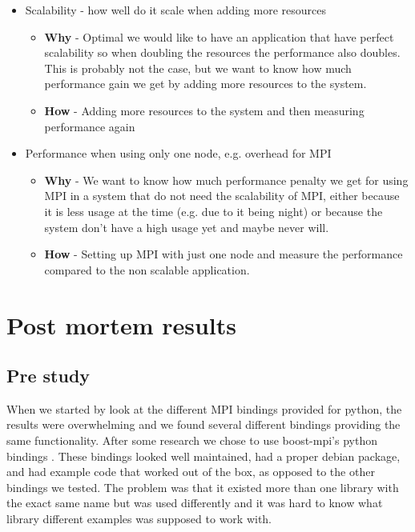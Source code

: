 \documentclass{article}
\begin{document}
\begin{itemize}
\begin{itemize}
{ performance we want to know how much we are able to increase it by using MPI. }
\item{ \textbf{How} - Measure the time to run the program with \emph{time}} (a UNIX command)
\end{itemize}
\item Scalability - how well do it scale when adding more resources
\begin{itemize}
\item{ \textbf{Why} - Optimal we would like to have an application that have
perfect scalability \cite{jogalekar2000evaluating} so when doubling the
resources the performance also doubles. This is probably not the case, but we
want to know how much performance gain we get by adding more resources to the
system. }


\item{ \textbf{How} - Adding more resources to the system and then measuring performance
 again}
\end{itemize}
\item Performance when using only one node, e.g. overhead for MPI
\begin{itemize}
\item{ \textbf{Why} - We want to know how much performance penalty we get for using
MPI in a system that do not need the scalability of MPI, either because it is 
less usage at the time (e.g. due to it being night) or because the system
don't have a high usage yet and maybe never will.}
\item{ \textbf{How} - Setting up MPI with just one node and measure the performance
 compared to the non scalable application. }
\end{itemize}
\end{itemize}


\section{Post mortem results}\label{mpi}
\subsection{Pre study}
When we started by look at the different MPI bindings provided for python, the
results were overwhelming and we found several different bindings providing the
same functionality. After some research we chose to use boost-mpi's python
bindings \cite{boost-mpi}. These bindings looked well maintained, had a proper
debian package, and had example code that worked out of the box, as opposed to
the other bindings we tested. The problem was that it existed more than
one library with the exact same name but was used differently and it was hard
to know what library different examples was supposed to work with. 
\end{document}
